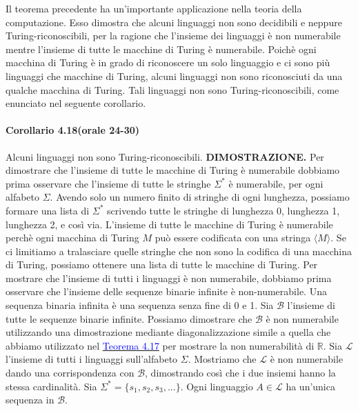 \documentclass{article}
\begin{document}
Il teorema precedente ha un'importante applicazione nella teoria della computazione.
Esso dimostra che alcuni linguaggi non sono decidibili e neppure Turing-riconoscibili, per la ragione che l'insieme dei linguaggi è non numerabile mentre l'insieme di tutte le macchine di Turing è numerabile.
Poichè ogni macchina di Turing è in grado di riconoscere un solo linguaggio e ci sono più linguaggi che macchine di Turing, alcuni linguaggi non sono riconosciuti da una qualche macchina di Turing.
Tali linguaggi non sono Turing-riconoscibili, come enunciato nel seguente corollario.

\paragraph{Corollario 4.18(orale 24-30)}
\label{corollario-4.18}
\text{}
Alcuni linguaggi non sono Turing-riconoscibili.
\vspace{1em}
\text{}
\newline
\hbox{\textbf{DIMOSTRAZIONE.}} 
Per dimostrare che l'insieme di tutte le macchine di Turing è numerabile dobbiamo prima osservare che l'insieme di tutte le stringhe $\Sigma^*$ è numerabile, per ogni alfabeto $\Sigma$.
Avendo solo un numero finito di stringhe di ogni lunghezza, possiamo formare una lista di $\Sigma^*$ scrivendo tutte le stringhe di lunghezza 0, lunghezza 1, lunghezza 2, e così via.
L'insieme di tutte le macchine di Turing è numerabile perchè ogni macchina di Turing $M$ può essere codificata con una stringa $\langle M \rangle$.
Se ci limitiamo a tralasciare quelle stringhe che non sono la codifica di una macchina di Turing, possiamo ottenere una lista di tutte le macchine di Turing.
Per mostrare che l'insieme di tutti i linguaggi è non numerabile, dobbiamo prima osservare che l'insieme delle sequenze binarie infinite è non-numerabile.
Una sequenza binaria infinita è una sequenza senza fine di 0 e 1.
Sia $\mathcal{B}$ l'insieme di tutte le sequenze binarie infinite.
Possiamo dimostrare che $\mathcal{B}$ è non numerabile utilizzando una dimostrazione mediante diagonalizzazione simile a quella che abbiamo utilizzato nel \hyperref[teorema-4.17]{\textcolor{blue}{Teorema 4.17}} per mostrare la non numerabilità di $\mathbb{R}$.
Sia $\mathcal{L}$ l'insieme di tutti i linguaggi sull'alfabeto $\Sigma$.
Mostriamo che $\mathcal{L}$ è non numerabile dando una corrispondenza con $\mathcal{B}$, dimostrando così che i due insiemi hanno la stessa cardinalità.
Sia $\Sigma^* = \{s_1, s_2, s_3, ...\}$.
Ogni linguaggio $A \in \mathcal{L}$ ha un'unica sequenza in $\mathcal{B}$.
\end{document}
